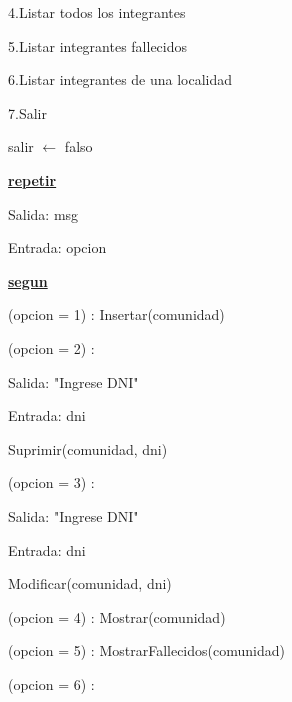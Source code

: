 \documentclass{article}
\begin{document}
        \hspace{17mm}4.Listar todos los integrantes

        \hspace{17mm}5.Listar integrantes fallecidos

        \hspace{17mm}6.Listar integrantes de una localidad

        \hspace{17mm}7.Salir

    \hspace{4mm}salir $\leftarrow$ falso

    \hspace{4mm}\underline{\textbf{repetir}} 

    \hspace{8mm}Salida: msg

    \hspace{8mm}Entrada: opcion

    \hspace{8mm}\underline{\textbf{segun}}

    \hspace{12mm}(opcion = 1) : Insertar(comunidad)

    \hspace{12mm}(opcion = 2) :

        \hspace{16mm}Salida: "Ingrese DNI"

        \hspace{16mm}Entrada: dni
        
        \hspace{16mm}Suprimir(comunidad, dni)

    \hspace{12mm}(opcion = 3) : 
    
        \hspace{16mm}Salida: "Ingrese DNI"

        \hspace{16mm}Entrada: dni
        
        \hspace{16mm}Modificar(comunidad, dni)

    \hspace{12mm}(opcion = 4) : Mostrar(comunidad)

    \hspace{12mm}(opcion = 5) : MostrarFallecidos(comunidad)

    \hspace{12mm}(opcion = 6) : 
    
\end{document}
